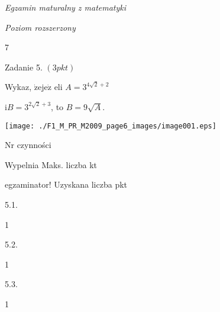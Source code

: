 \documentclass[a4paper,12pt]{article}
\begin{document}
{\it Egzamin maturalny z matematyki}

{\it Poziom rozszerzony}

7

Zadanie 5. $(3pkt)$

Wykaz, $\dot{\mathrm{z}}\mathrm{e}\mathrm{j}\mathrm{e}\dot{\mathrm{z}}$ eli $A=3^{4\sqrt{2}+2}$

$\mathrm{i} B=3^{2\sqrt{2}+3}$, to $B=9\sqrt{A}.$
\begin{center}
\texttt{[image: ./F1\_M\_PR\_M2009\_page6\_images/image001.eps]}
\end{center}
Nr czynności

Wypelnia Maks. liczba kt

egzaminator! Uzyskana liczba pkt

5.1.

1

5.2.

1

5.3.

1
\end{document}
